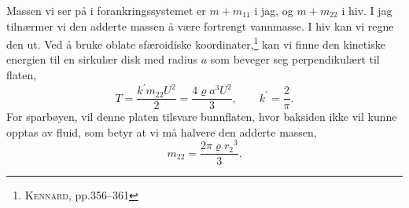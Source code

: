 Massen vi ser på i forankringssystemet er $m + m_{11}$ i jag, og $m + m_{22}$ i hiv.
I jag tilnærmer vi den adderte massen å være fortrengt vannmasse.
I hiv kan vi regne den ut.
Ved å bruke oblate sfæroidiske koordinater,\footnote{\cite{kennard1967irrotational} \textsc{Kennard}, pp.356--361} kan vi finne den kinetiske energien til en sirkulær disk med radius $a$ som beveger seg perpendikulært til flaten,
\[
T = \frac{k^{\prime} m_{22} U^2}{2} = \frac{4\varrho a^3 U^2}{3}, \qquad k^{\prime} = \frac{2}{\pi}.
\]
For sparbøyen, vil denne platen tilsvare bunnflaten, hvor baksiden ikke vil kunne opptas av fluid, som betyr at vi må halvere den adderte massen,
\[
m_{22} = \frac{2\pi\varrho {r_2}^3}{3}.
\]
